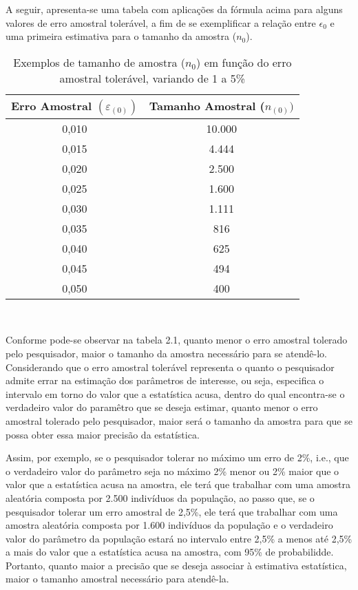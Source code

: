 \newpage
A seguir, apresenta-se uma tabela com aplicações da fórmula acima para alguns valores de erro amostral tolerável, a fim de se exemplificar a relação entre $\epsilon_{0}$ e uma primeira estimativa para o tamanho da amostra ($n_{0}$).




\begin{table}[!htb]
    \centering
    {
    \caption{Exemplos de tamanho de amostra ($n_{0}$) em função do erro amostral tolerável, variando de 1 a 5\%}
    \label{amostras}
    \vspace{0.1cm}
\begin{tabular}{c|c}
  \hline\hline
  Erro Amostral $(\varepsilon_{(0)})$   & Tamanho Amostral ($n_{(0)})$ \\
  \hline\hline
  0,010    &  10.000 \\
  0,015    &  4.444 \\
  0,020    &  2.500 \\
  0,025    &  1.600 \\
  0,030    &  1.111 \\
  0,035    &  816 \\
  0,040    &  625 \\
  0,045    &  494 \\
  0,050    &  400 \\
  \hline\hline
\end{tabular}}
\\
\hspace{-1.0cm}
\end{table}


Conforme pode-se observar na tabela 2.1, quanto menor o erro
amostral tolerado pelo pesquisador, maior o tamanho da amostra
necessário para se atendê-lo. Considerando que o erro amostral
tolerável representa o quanto o pesquisador admite errar na
estimação dos parâmetros de interesse, ou seja, especifica o
intervalo em torno do valor que a estatística acusa, dentro do
qual encontra-se o verdadeiro valor do paramêtro que se deseja
estimar, quanto menor o erro amostral tolerado pelo pesquisador,
maior será o tamanho da amostra para que se possa obter essa maior
precisão da estatística.\vskip0.3cm



Assim, por exemplo, se o pesquisador tolerar no máximo um erro de 2\%, i.e., que o verdadeiro valor do parâmetro seja no máximo 2\% menor ou 2\% maior que o valor que a estatística acusa na amostra, ele terá que trabalhar com uma amostra aleatória composta por 2.500 indivíduos da população, ao passo que, se o pesquisador tolerar um erro amostral de 2,5\%, ele terá que trabalhar com uma amostra aleatória composta por 1.600 indivíduos da população e o verdadeiro valor do parâmetro da população estará no intervalo entre 2,5\% a menos até 2,5\% a mais do valor que a estatística acusa na amostra, com 95\% de probabilidde. Portanto, quanto maior a precisão que se deseja associar à estimativa estatística, maior o tamanho amostral necessário para atendê-la.\vskip0.3cm


